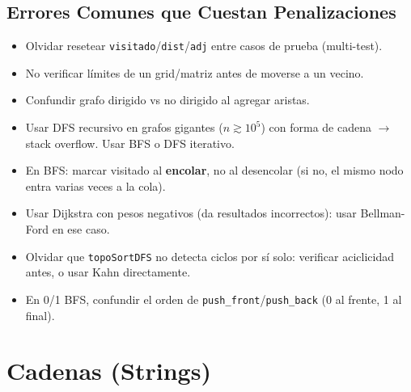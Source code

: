 \documentclass[10pt,twocolumn,letterpaper]{report}
\begin{document}
\section{Errores Comunes que Cuestan Penalizaciones}
\begin{itemize}
    \item Olvidar resetear \texttt{visitado}/\texttt{dist}/\texttt{adj} entre casos de prueba (multi-test).
    \item No verificar límites de un grid/matriz antes de moverse a un vecino.
    \item Confundir grafo dirigido vs no dirigido al agregar aristas.
    \item Usar DFS recursivo en grafos gigantes ($n \gtrsim 10^5$) con forma de cadena $\rightarrow$ stack overflow. Usar BFS o DFS iterativo.
    \item En BFS: marcar visitado al \textbf{encolar}, no al desencolar (si no, el mismo nodo entra varias veces a la cola).
    \item Usar Dijkstra con pesos negativos (da resultados incorrectos): usar Bellman-Ford en ese caso.
    \item Olvidar que \texttt{topoSortDFS} no detecta ciclos por sí solo: verificar aciclicidad antes, o usar Kahn directamente.
    \item En 0/1 BFS, confundir el orden de \texttt{push\_front}/\texttt{push\_back} (0 al frente, 1 al final).
\end{itemize}

\chapter{Cadenas (Strings)}
\end{document}
